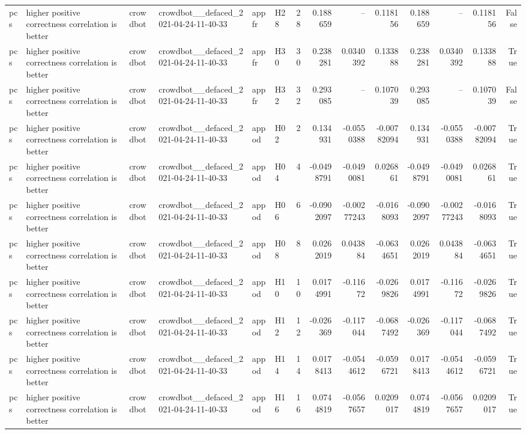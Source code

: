 \begin{longtable}{llllllrrrrrrrr}
pcs & higher positive correctness correlation is better & crowdbot & crowdbot\_\_defaced\_2021-04-24-11-40-33 & appfr & H28 & 28 & 0.188659 & -- & 0.118156 & 0.188659 & -- & 0.118156 & False \\
pcs & higher positive correctness correlation is better & crowdbot & crowdbot\_\_defaced\_2021-04-24-11-40-33 & appfr & H30 & 30 & 0.238281 & 0.0340392 & 0.133888 & 0.238281 & 0.0340392 & 0.133888 & True \\
pcs & higher positive correctness correlation is better & crowdbot & crowdbot\_\_defaced\_2021-04-24-11-40-33 & appfr & H32 & 32 & 0.293085 & -- & 0.107039 & 0.293085 & -- & 0.107039 & False \\
pcs & higher positive correctness correlation is better & crowdbot & crowdbot\_\_defaced\_2021-04-24-11-40-33 & appod & H02 & 2 & 0.134931 & -0.0550388 & -0.00782094 & 0.134931 & -0.0550388 & -0.00782094 & True \\
pcs & higher positive correctness correlation is better & crowdbot & crowdbot\_\_defaced\_2021-04-24-11-40-33 & appod & H04 & 4 & -0.0498791 & -0.0490081 & 0.026861 & -0.0498791 & -0.0490081 & 0.026861 & True \\
pcs & higher positive correctness correlation is better & crowdbot & crowdbot\_\_defaced\_2021-04-24-11-40-33 & appod & H06 & 6 & -0.0902097 & -0.00277243 & -0.0168093 & -0.0902097 & -0.00277243 & -0.0168093 & True \\
pcs & higher positive correctness correlation is better & crowdbot & crowdbot\_\_defaced\_2021-04-24-11-40-33 & appod & H08 & 8 & 0.0262019 & 0.043884 & -0.0634651 & 0.0262019 & 0.043884 & -0.0634651 & True \\
pcs & higher positive correctness correlation is better & crowdbot & crowdbot\_\_defaced\_2021-04-24-11-40-33 & appod & H10 & 10 & 0.0174991 & -0.11672 & -0.0269826 & 0.0174991 & -0.11672 & -0.0269826 & True \\
pcs & higher positive correctness correlation is better & crowdbot & crowdbot\_\_defaced\_2021-04-24-11-40-33 & appod & H12 & 12 & -0.026369 & -0.117044 & -0.0687492 & -0.026369 & -0.117044 & -0.0687492 & True \\
pcs & higher positive correctness correlation is better & crowdbot & crowdbot\_\_defaced\_2021-04-24-11-40-33 & appod & H14 & 14 & 0.0178413 & -0.0544612 & -0.0596721 & 0.0178413 & -0.0544612 & -0.0596721 & True \\
pcs & higher positive correctness correlation is better & crowdbot & crowdbot\_\_defaced\_2021-04-24-11-40-33 & appod & H16 & 16 & 0.0744819 & -0.0567657 & 0.0209017 & 0.0744819 & -0.0567657 & 0.0209017 & True \\

\end{longtable}
